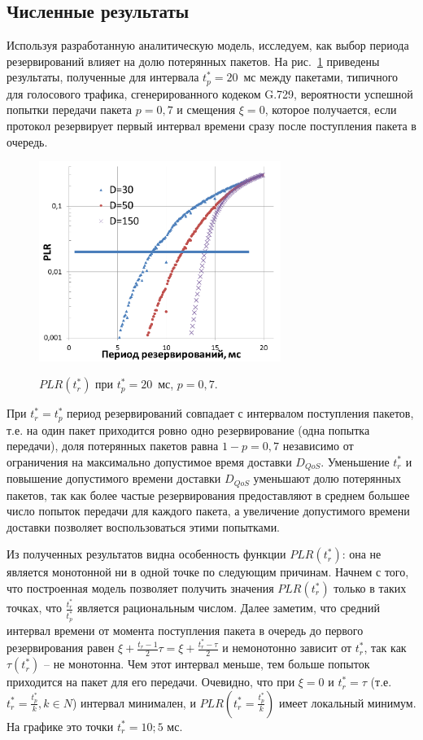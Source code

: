 \subsection{Численные результаты}
Используя разработанную аналитическую модель, исследуем, как выбор периода резервирований влияет на долю потерянных пакетов. На рис.~\ref{fig:mcca:an:results:plr_vs_tc} приведены результаты, полученные для интервала $t_p^* = 20$~мс между пакетами, типичного для голосового трафика, сгенерированного кодеком G.729, вероятности успешной попытки передачи пакета $p = 0,7$ и смещения $\xi=0$, которое получается, если протокол резервирует первый интервал времени сразу после поступления пакета в очередь.

\begin{figure}[!htbp]
\centering
    \includegraphics[width=0.7\textwidth]{pic/results.png} \\
    \caption{\label{fig:mcca:an:results:plr_vs_tc} $PLR(t_r^*)$ при $t_p^* = 20$~мс, $p = 0,7$.}
\end{figure}

При  $t_r^* = t_p^*$ период резервирований совпадает с интервалом поступления пакетов, т.е. на один пакет приходится ровно одно резервирование (одна попытка передачи), доля потерянных пакетов равна $1-p=0,7$ независимо от ограничения на максимально допустимое время доставки  $D_{QoS}$. Уменьшение $t_r^*$ и повышение допустимого времени доставки $D_{QoS}$  уменьшают долю потерянных пакетов, так как более частые резервирования предоставляют в среднем большее число попыток передачи для каждого пакета, а увеличение допустимого времени доставки позволяет воспользоваться этими попытками.

Из полученных результатов видна особенность функции $PLR(t_r^*)$: она не является монотонной ни в одной точке по следующим причинам.
Начнем с того, что построенная модель позволяет получить значения $PLR(t_r^*)$ только в таких точках, что $\frac{t_r^*}{t_p^*}$ является рациональным числом. Далее заметим, что средний интервал времени от момента поступления пакета в очередь до первого резервирования равен $\xi+\frac{t_r-1}{2}\tau=\xi+\frac{t_r^*-\tau}{2}$ и немонотонно зависит от $t_r^*$, так как $\tau(t_r^*)$ -- не монотонна. Чем этот интервал меньше, тем больше попыток приходится на пакет для его передачи. Очевидно, что при  $\xi=0$ и $t_r^*=\tau$ (т.е. $t_r^* = \frac{t_p^*}{k}, k \in N$)  интервал минимален, и  $PLR(t_r^* = \frac{t_p^*}{k})$ имеет локальный минимум. На графике это точки $t_r^*=10; 5$ мс.

